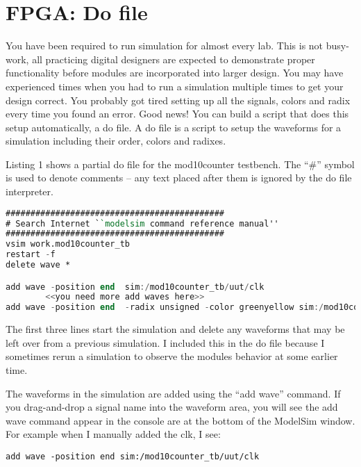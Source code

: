 \section{FPGA: Do file}
You have been required to run simulation for almost every lab. This is not 
busy-work, all practicing digital designers are expected to demonstrate
proper functionality before modules are incorporated into larger design.
You may have experienced times when you had to run a simulation 
multiple times to get your design correct.  You probably got tired setting 
up all the signals, colors and radix every time you found an error.  Good
news! You can build a script that does this setup automatically, a do file.  
A do file is a script to setup the waveforms for a simulation 
including their order, colors and radixes. 

Listing 1 shows a partial do file for the mod10counter testbench. The
``\#'' symbol is used to denote comments -- any text placed after them
is ignored by the do file interpreter.


\begin{lstlisting}[language=Verilog,
 caption={A partial do file for the mod10counter.},
basicstyle=\tiny\ttfamily,
 label={listing:mod10Counter},
 frame=single]
############################################
# Search Internet ``modelsim command reference manual''
############################################
vsim work.mod10counter_tb
restart -f
delete wave *

add wave -position end  sim:/mod10counter_tb/uut/clk
		<<you need more add waves here>>
add wave -position end  -radix unsigned -color greenyellow sim:/mod10counter_tb/uut/currentCount
 \end{lstlisting}
 
The first three lines start the simulation and delete any waveforms that
may be left over from a previous simulation. I included this in the do
file because I sometimes rerun a simulation to observe the modules
behavior at some earlier time.

The waveforms in the simulation are added using the ``add wave''
command. If you drag-and-drop a signal name into the waveform area, you
will see the add wave command appear in the console are at the bottom of
the ModelSim window. For example when I manually added the clk, I see:

\begin{verbatim}
add wave -position end sim:/mod10counter_tb/uut/clk
\end{verbatim}


